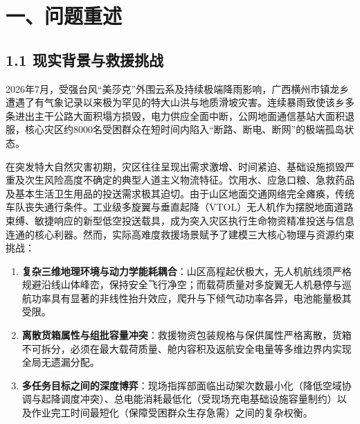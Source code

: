 \documentclass[12pt,a4paper,UTF8]{ctexart}
\begin{document}
\begin{abstract}
最后，本文搭建了涵盖后续问题二（多点多架次车辆路径排程）、问题三（视距遮挡与空中中继协同保障）及问题四（任务组空间聚类与峰值资源配置核算）的完整论文框架，为全题系统化建模与工程应用奠定了坚实的理论与算法基石。

\textbf{关键词}：应急物资运输；无人机组批；空气动力学非线性能耗；最大安全载荷；集合划分模型；状态压缩动态规划；帕累托优化；敏感性分析
\end{abstract}

\newpage

\section{一、问题重述}

\subsection{1.1 现实背景与救援挑战}
2026年7月，受强台风“美莎克”外围云系及持续极端降雨影响，广西横州市镇龙乡遭遇了有气象记录以来极为罕见的特大山洪与地质滑坡灾害。连续暴雨致使该乡多条进出主干公路大面积塌方损毁，电力供应全面中断，公网地面通信基站大面积退服，核心灾区约8000名受困群众在短时间内陷入“断路、断电、断网”的极端孤岛状态。

在突发特大自然灾害初期，灾区往往呈现出需求激增、时间紧迫、基础设施损毁严重及次生风险高度不确定的典型人道主义物流特征\cite{caunhye2012, holguin2012}。饮用水、应急口粮、急救药品及基本生活卫生用品的投送需求极其迫切。由于山区地面交通网络完全瘫痪，传统车队丧失通行条件。工业级多旋翼与垂直起降（VTOL）无人机作为摆脱地面道路束缚、敏捷响应的新型低空投送载具，成为突入灾区执行生命物资精准投送与信息连通的核心利器\cite{murray2015, otto2018}。然而，实际高难度救援场景赋予了建模三大核心物理与资源约束挑战：
\begin{enumerate}[leftmargin=*]
    \item \textbf{复杂三维地理环境与动力学能耗耦合}：山区高程起伏极大，无人机航线须严格规避沿线山体峰峦，保持安全飞行净空；而载荷质量对多旋翼无人机悬停与巡航功率具有显著的非线性抬升效应，爬升与下倾气动功率各异，电池能量极其受限。
    \item \textbf{离散货箱属性与组批容量冲突}：救援物资包装规格与保供属性严格离散，货箱不可拆分，必须在最大载荷质量、舱内容积及返航安全电量等多维边界内实现全局无遗漏分配。
    \item \textbf{多任务目标之间的深度博弈}：现场指挥部面临出动架次数最小化（降低空域协调与起降调度冲突）、总电能消耗最低化（受现场充电基础设施容量制约）以及作业完工时间最短化（保障受困群众生存急需）之间的复杂权衡。
\end{enumerate}
\end{document}
